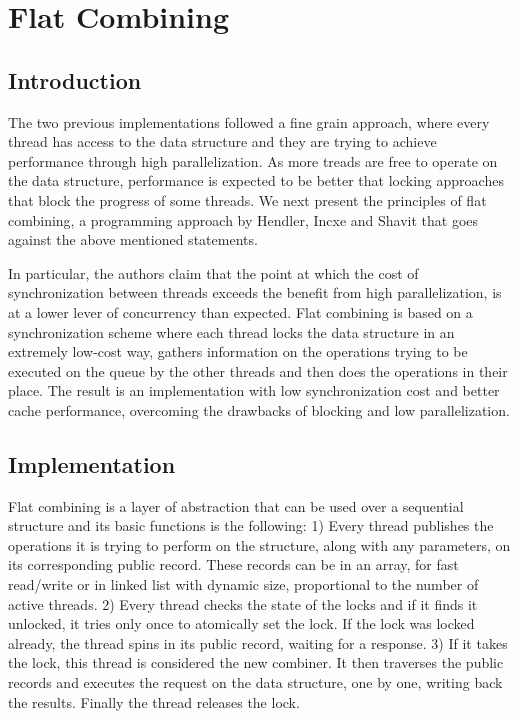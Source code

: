 \section{Flat Combining}
\subsection{Introduction}

The two previous implementations followed a fine grain approach, where every thread has access to the data structure and they are trying to achieve performance through high parallelization. As more treads are free to operate on the data structure, performance is expected to be better that locking approaches that block the progress of some threads. We next present the principles of flat combining, a programming approach by Hendler, Incxe and Shavit \cite{flat_combining} that goes against the above mentioned statements.

In particular, the authors claim that the point at which the cost of synchronization between threads exceeds the benefit from high parallelization, is at a lower lever of concurrency than expected. Flat combining is based on a synchronization scheme where each thread locks  the data structure in an extremely low-cost way, gathers information on the operations trying to be executed on the queue by the other threads and then does the operations in their place. The result is an implementation with low synchronization cost and better cache performance, overcoming the drawbacks of blocking and low parallelization.

\subsection{Implementation}

Flat combining is a layer of abstraction that can be used over a sequential structure and its basic functions is the following:
1) Every thread publishes the operations it is trying to perform on the structure, along with any parameters, on its corresponding public record. These records can be in an array, for fast read/write or in linked list with dynamic size, proportional to the number of active threads.
2) Every thread checks the state of the locks and if it finds it unlocked, it tries only once to atomically set the lock. If the lock was locked already, the thread spins in its public record, waiting for a response.
3) If it takes the lock, this thread is considered the new combiner. It then traverses the public records and executes the request on the data structure, one by one, writing back the results. Finally the thread releases the lock.


